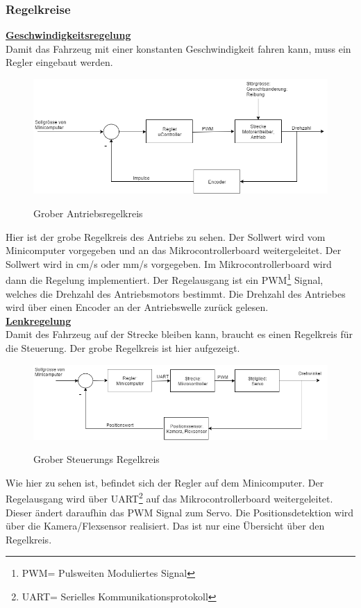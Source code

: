 \subsubsection{Regelkreise}
\underline{\textbf{Geschwindigkeitsregelung}}\\[0.2cm]
Damit das Fahrzeug mit einer konstanten Geschwindigkeit fahren kann, muss ein Regler eingebaut werden.
\begin{figure}[H]
	\centering
	\includegraphics[width=1\textwidth]{03_Loesungskonzept/pictures/Gesch_Regelung.png}
	\label{Regelung_Gesch}
	\caption{Grober Antriebsregelkreis}
\end{figure}\flushleft
Hier ist der grobe Regelkreis des Antriebs zu sehen. Der Sollwert wird vom Minicomputer vorgegeben und an das Mikrocontrollerboard weitergeleitet. Der Sollwert wird in cm/s oder mm/s vorgegeben. Im Mikrocontrollerboard wird dann die Regelung implementiert. Der Regelausgang ist ein PWM\footnote{PWM= Pulsweiten Moduliertes Signal} Signal, welches die Drehzahl des Antriebsmotors bestimmt. Die Drehzahl des Antriebes wird über einen Encoder an der Antriebswelle zurück gelesen.\\[0.2cm]
\underline{\textbf{Lenkregelung}}\\[0.2cm]
Damit des Fahrzeug auf der Strecke bleiben kann, braucht es einen Regelkreis für die Steuerung. Der grobe Regelkreis ist hier aufgezeigt.
\begin{figure}[H]
	\centering
	\includegraphics[width=1\textwidth]{03_Loesungskonzept/pictures/Lenk_Regelung.png}
	\label{Regelung_Lenken}
	\caption{Grober Steuerungs Regelkreis }
\end{figure}\flushleft
Wie hier zu sehen ist, befindet sich der Regler auf dem Minicomputer. Der Regelausgang wird über UART\footnote{UART= Serielles Kommunikationsprotokoll} auf das Mikrocontrollerboard weitergeleitet. Dieser ändert daraufhin das PWM Signal zum Servo. Die Positionsdetektion wird über die Kamera/Flexsensor realisiert. Das ist nur eine Übersicht über den Regelkreis.
